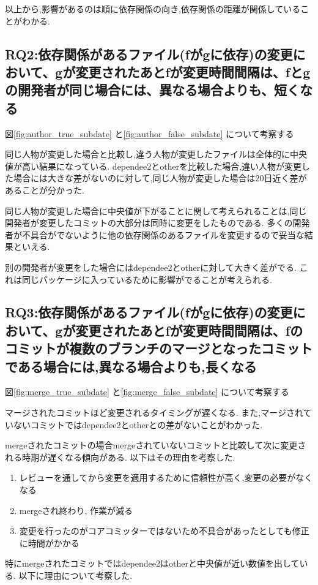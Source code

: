 \documentclass{fose2016}           %
\begin{document}
以上から,影響があるのは順に依存関係の向き,依存関係の距離が関係していることがわかる.


\subsection{RQ2:依存関係があるファイル(fがgに依存)の変更において、gが変更されたあとfが変更時間間隔は、fとgの開発者が同じ場合には、異なる場合よりも、短くなる}
図\ref{fig:author_true_subdate} と\ref{fig:author_false_subdate} について考察する

同じ人物が変更した場合と比較し,違う人物が変更したファイルは全体的に中央値が高い結果になっている.
dependee2とotherを比較した場合,違い人物が変更した場合には大きな差がないのに対して,同じ人物が変更した場合は20日近く差があることが分かった.

同じ人物が変更した場合に中央値が下がることに関して考えられることは,同じ開発者が変更したコミットの大部分は同時に変更をしたものである.
多くの開発者が不具合がでないように他の依存関係のあるファイルを変更するので妥当な結果といえる.

別の開発者が変更をした場合にはdependee2とotherに対して大きく差がでる.
これは同じパッケージに入っているために影響がでることが考えられる.

\subsection{RQ3:依存関係があるファイル(fがgに依存)の変更において、gが変更されたあとfが変更時間間隔は、fのコミットが複数のブランチのマージとなったコミットである場合には,異なる場合よりも,長くなる}
図\ref{fig:merge_true_subdate} と\ref{fig:merge_false_subdate} について考察する

マージされたコミットほど変更されるタイミングが遅くなる.
また,マージされていないコミットではdependee2とotherとの差がないことがわかった.


mergeされたコミットの場合mergeされていないコミットと比較して次に変更される時期が遅くなる傾向がある.
以下はその理由を考察した.
\begin{enumerate}
\item レビューを通してから変更を適用するために信頼性が高く,変更の必要がなくなる
\item mergeされ終わり, 作業が減る
\item 変更を行ったのがコアコミッターではないため不具合があったとしても修正に時間がかかる
\end{enumerate}

特にmergeされたコミットではdependee2はotherと中央値が近い数値を出している.
以下に理由について考察した.
\end{document}
